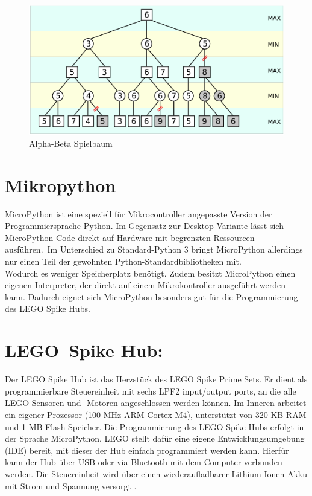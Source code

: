 \begin{figure}[H]
	\centering
	\includegraphics[width=1\linewidth]{images/alpha_beta}
	\caption[Alpha-Beta Spielbaum Quelle: \autocite{wikimediaABpruning}]{Alpha-Beta Spielbaum}
	\label{fig:alphabeta}
\end{figure}



\section{Mikropython}
MicroPython ist eine speziell für Mikrocontroller angepasste Version der Programmiersprache Python. Im Gegensatz zur Desktop-Variante lässt sich MicroPython-Code direkt auf Hardware mit begrenzten Ressourcen ausführen\autocite{energy_responsiveness2023}\autocite{Plauska2023}.\
Im Unterschied zu Standard-Python 3 bringt MicroPython allerdings nur einen Teil der gewohnten Python-Standardbibliotheken mit.\\ Wodurch es weniger Speicherplatz benötigt.
Zudem besitzt MicroPython einen eigenen Interpreter, der direkt auf einem Mikrokontroller ausgeführt werden kann.
Dadurch eignet sich MicroPython besonders gut für die Programmierung des LEGO Spike Hubs\autocite{bell2024micropython}.



\section{LEGO Spike Hub:}
Der LEGO Spike Hub ist das Herzstück des LEGO Spike Prime Sets. Er dient als programmierbare Steuereinheit mit sechs LPF2 input/output ports, an die alle LEGO-Sensoren und -Motoren angeschlossen werden können. Im Inneren arbeitet ein eigener Prozessor (100 MHz ARM Cortex-M4), unterstützt von 320 KB RAM und 1 MB Flash-Speicher. Die Programmierung des LEGO Spike Hubs erfolgt in der Sprache MicroPython. LEGO stellt dafür eine eigene Entwicklungsumgebung (IDE) bereit, mit dieser der Hub einfach programmiert werden kann. Hierfür kann der Hub über USB oder via Bluetooth mit dem Computer verbunden werden. Die Steuereinheit wird über einen  wiederaufladbarer Lithium-Ionen-Akku mit Strom und Spannung versorgt \autocite{lego2020techniclargehub}.

